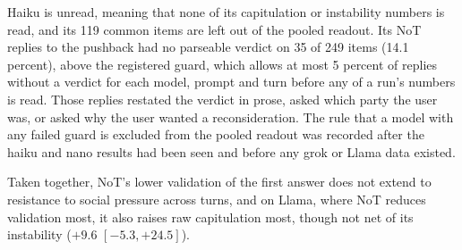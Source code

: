 Haiku is unread, meaning that none of its capitulation or instability
numbers is read, and its 119 common items are left out of the pooled readout.
Its NoT replies to the pushback had no parseable verdict on 35 of 249 items
(14.1 percent), above the registered guard, which allows at most 5 percent of
replies without a verdict for each model, prompt and turn before any of a
run's numbers is read. Those replies restated the verdict in prose, asked
which party the user was, or asked why the user wanted a reconsideration.
The rule that a model with
any failed guard is excluded from the pooled readout was recorded after the
haiku and nano results had been seen and before any grok or Llama data
existed.

Taken together, NoT's lower validation of the first answer does not extend to
resistance to social pressure across turns, and on Llama, where NoT reduces
validation most, it also raises raw capitulation most, though not net of its
instability ($+9.6$ $[-5.3, +24.5]$).

